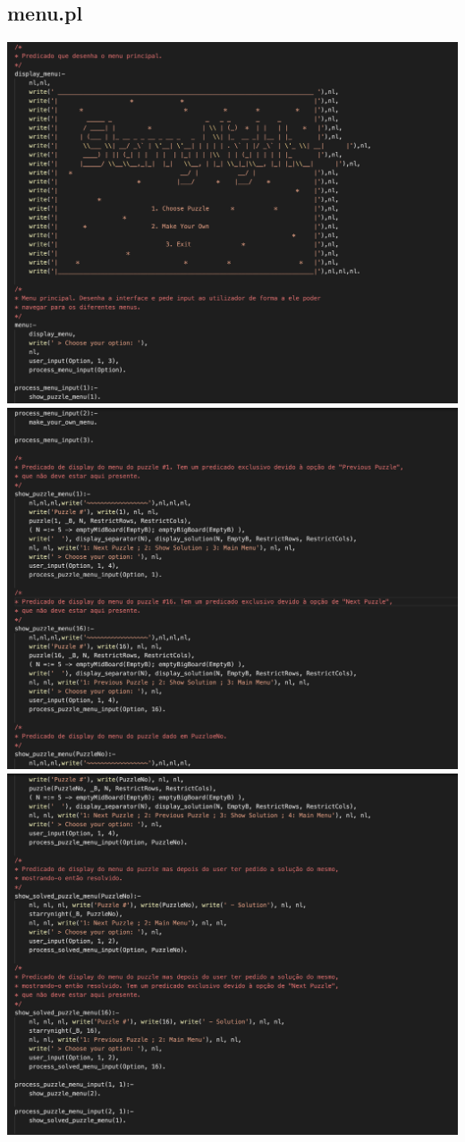 \documentclass[a4paper]{article}
\begin{document}
\subsection{menu.pl}
\begin{center}
    \includegraphics[scale=0.4]{img/13.png}
    \includegraphics[scale=0.4]{img/14.png}
    \includegraphics[scale=0.4]{img/15.png}

\end{center}
\end{document}
